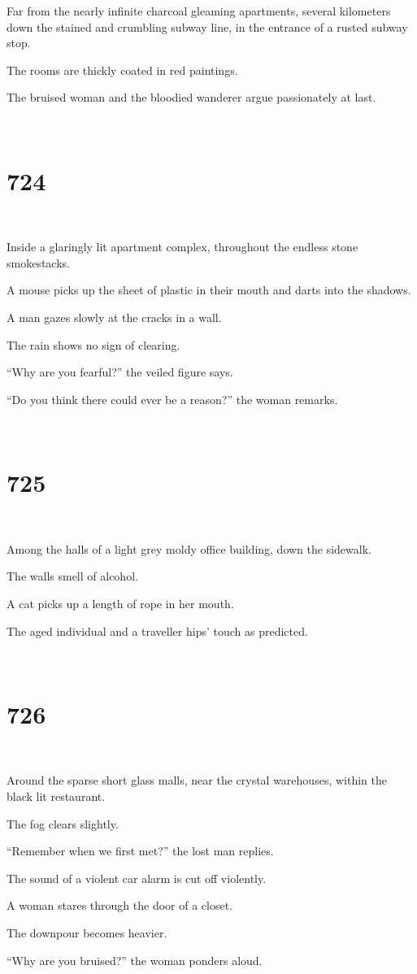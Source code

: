 \documentclass{report}
\begin{document}
Far from the nearly infinite charcoal gleaming apartments, several kilometers down the stained and crumbling subway line, in the entrance of a rusted subway stop.

The rooms are thickly coated in red paintings.

The bruised woman and the bloodied wanderer argue passionately at last.

~
\chapter*{724}
~

Inside a glaringly lit apartment complex, throughout the endless stone smokestacks.

A mouse picks up the sheet of plastic in their mouth and darts into the shadows.

A man gazes slowly at the cracks in a wall.

The rain shows no sign of clearing.

``Why are you fearful?'' the veiled figure says.

``Do you think there could ever be a reason?'' the woman remarks.

~
\chapter*{725}
~

Among the halls of a light grey moldy office building, down the sidewalk.

The walls smell of alcohol.

A cat picks up a length of rope in her mouth.

The aged individual and a traveller hips' touch as predicted.

~
\chapter*{726}
~

Around the sparse short glass malls, near the crystal warehouses, within the black lit restaurant.

The fog clears slightly.

``Remember when we first met?'' the lost man replies.

The sound of a violent car alarm is cut off violently.

A woman stares through the door of a closet.

The downpour becomes heavier.

``Why are you bruised?'' the woman ponders aloud.
\end{document}
